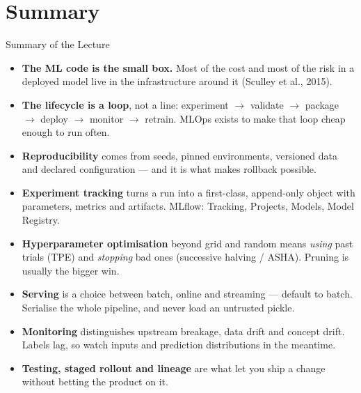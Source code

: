 \section{Summary}

\begin{frame}[allowframebreaks]{Summary of the Lecture}

    \begin{itemize}
        \item \textbf{The ML code is the small box.} Most of the cost and most of the risk in a deployed
              model live in the infrastructure around it (Sculley et al., 2015).

        \item \textbf{The lifecycle is a loop}, not a line: experiment $\rightarrow$ validate $\rightarrow$
              package $\rightarrow$ deploy $\rightarrow$ monitor $\rightarrow$ retrain. MLOps exists to make
              that loop cheap enough to run often.

        \item \textbf{Reproducibility} comes from seeds, pinned environments, versioned data and declared
              configuration --- and it is what makes rollback possible.

        \item \textbf{Experiment tracking} turns a run into a first-class, append-only object with
              parameters, metrics and artifacts. MLflow: Tracking, Projects, Models, Model Registry.

        \item \textbf{Hyperparameter optimisation} beyond grid and random means \emph{using} past trials
              (TPE) and \emph{stopping} bad ones (successive halving / ASHA). Pruning is usually the bigger win.

        \item \textbf{Serving} is a choice between batch, online and streaming --- default to batch.
              Serialise the whole pipeline, and never load an untrusted pickle.

        \item \textbf{Monitoring} distinguishes upstream breakage, data drift and concept drift. Labels lag,
              so watch inputs and prediction distributions in the meantime.

        \item \textbf{Testing, staged rollout and lineage} are what let you ship a change without betting the
              product on it.
    \end{itemize}

\end{frame}

